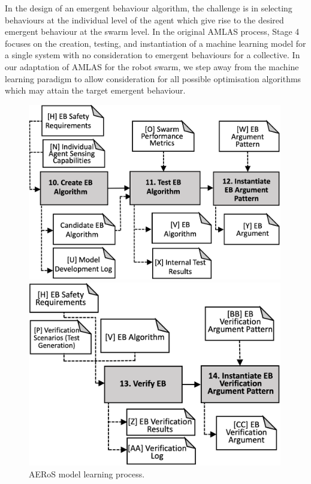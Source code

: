 \documentclass[runningheads]{llncs}
\begin{document}
In the design of an emergent behaviour algorithm, the challenge is in selecting behaviours at the individual level of the agent which give rise to the desired emergent behaviour at the swarm level. 
In the original AMLAS process, Stage 4 focuses on the creation, testing, and instantiation of a machine learning model for a single system with no consideration to emergent behaviours for a collective. 
In our adaptation of AMLAS for the robot swarm,  we step away from the machine learning paradigm to allow consideration for all possible optimisation algorithms which may attain the target emergent behaviour.

\begin{figure}[!h]
	\centering
	\begin{minipage}{.5\textwidth}
		\centering
		\includegraphics[width=0.99\textwidth]{figures/AMLAS-STAGE-4-V4.png}%
		\vspace{-2ex}
		\caption{AERoS model learning process.}
		\label{amlas-a-stage4}
	\end{minipage}%
	\begin{minipage}{.5\textwidth}
		\centering
		\includegraphics[width=0.99\textwidth]{figures/AMLAS-STAGE-5-V4.png}%

\end{minipage}
\end{figure}
\end{document}
